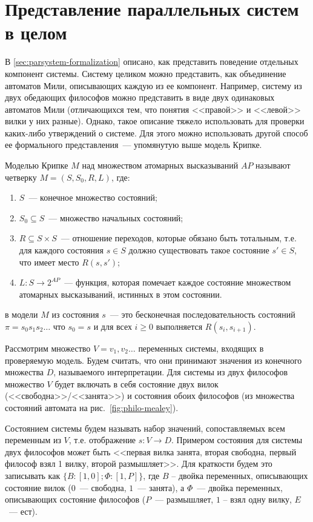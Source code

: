 \section{Представление параллельных систем в целом}

В \ref{sec:parsystem-formalization} описано, как представить поведение отдельных
компонент системы. Систему целиком можно представить, как объединение автоматов Мили,
описывающих каждую из ее компонент. Например, систему из двух обедающих философов можно
представить в виде двух одинаковых автоматов Мили (отличающихся тем, что понятия
<<правой>> и <<левой>> вилки у них разные). Однако, такое описание тяжело использовать для
проверки каких-либо утверждений о системе. Для этого можно использовать другой способ ее
формального представления~--- упомянутую выше модель Крипке.

Моделью Крипке $M$ над множеством атомарных высказываний $AP$ называют четверку $M=(S,
S_0, R, L)$, где:
\begin{enumerate}
\item $S$~--- конечное множество состояний;
\item $S_0 \subseteq S$~--- множество начальных состояний;
\item $R \subseteq S \times S$~--- отношение переходов, которые обязано быть тотальным,
  т.е. для каждого состояния $s \in S$ должно существовать такое состояние $s' \in S$, что
  имеет место $R(s, s')$;
\item $L: S \rightarrow 2^{AP}$~--- функция, которая помечает каждое состояние множеством
  атомарных высказываний, истинных в этом состоянии.
\end{enumerate}

 в модели $M$ из состояния $s$~--- это бесконечная последовательность состояний
$\pi = s_0s_1s_2 \ldots$ что $s_0 = s$ и для всех $i \geq 0$ выполняется $R(s_i,
s_{i+1})$.

Рассмотрим множество $V = {v_1, v_2 \ldots}$ переменных системы, входящих в проверяемую
модель. Будем считать, что они принимают значения из конечного множества $D$, называемого
 интерпретации. Для системы из двух философов множество $V$ будет включать в
себя состояние двух вилок (<<свободна>>/<<занята>>) и состояния обоих философов (из
множества состояний автомата на рис.~\ref{fig:philo-mealey}). 

Состоянием системы будем называть набор значений, сопоставляемых всем переменным из $V$,
т.е. отображение $s: V \rightarrow D$. Примером состояния для системы двух философов может
быть <<первая вилка занята, вторая свободна, первый философ взял 1 вилку, второй
размышляет>>. Для краткости будем это записывать как $\{B: [1, 0]; \Phi: [1, P]\}$, где $B$
-- двойка переменных, описывающих состояние вилок ($0$~--- свободна, $1$~--- занята), а
$\Phi$~--- двойка переменных, описывающих состояние философов ($P$~--- размышляет, $1$ --
взял одну вилку, $E$~--- ест).

